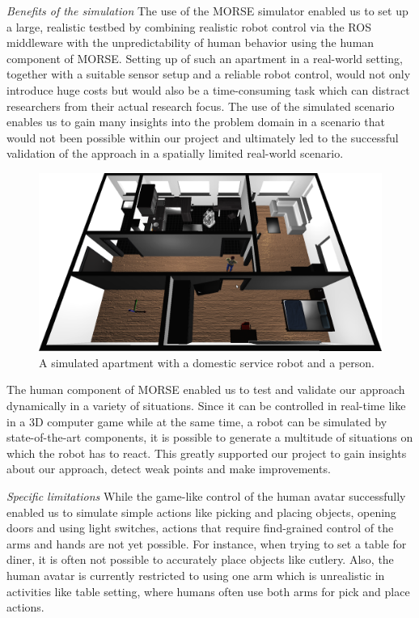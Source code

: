 \documentclass[conference]{IEEEtran}
\begin{document}
\emph{Benefits of the simulation} The use of the MORSE simulator enabled us to set up a large, 
realistic testbed by combining realistic robot control via the ROS middleware with the
unpredictability of human behavior using the human component of MORSE. Setting
up of such an apartment in a real-world setting, together with a suitable
sensor setup and a reliable robot control, would not only introduce huge costs
but would also be a time-consuming task which can distract researchers from
their actual research focus. The use of the simulated scenario enables us to
gain many insights into the problem domain in a scenario that would not been
possible within our project and ultimately led to the successful validation of
the approach in a spatially limited real-world scenario.

\begin{figure}[H]
      \centering
      \includegraphics[width=\linewidth]{morse_apartment.png}
      \caption{A simulated apartment with a domestic service robot and a person.}
      \label{fig|apartment}
\end{figure}

The human component of MORSE enabled us to test and validate our approach
dynamically in a variety of situations. Since it can be controlled in real-time
like in a 3D computer game while at the same time, a robot can be simulated by
state-of-the-art components, it is possible to generate a multitude of
situations on which the robot has to react. This greatly supported our project
to gain insights about our approach, detect weak points and make improvements.

\emph{Specific limitations} While the game-like control of the human avatar 
successfully enabled us to simulate simple actions like picking and placing objects, 
opening doors and using light switches, actions that require find-grained control 
of the arms and hands are not yet possible. For instance, when trying to set a table for 
diner, it is often not possible to accurately place objects like cutlery. Also, the human
avatar is currently restricted to using one arm which is unrealistic in activities 
like table setting, where humans often use both arms for pick and place actions.
 
\end{document}
